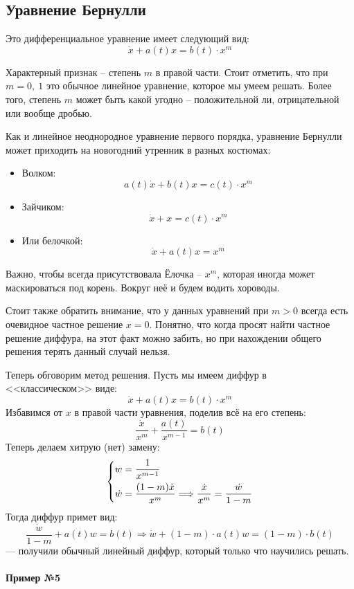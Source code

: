 \documentclass[a4paper,12pt]{article}
\newcommand{\dw}{\dot{w}}
\newcommand{\dx}{\dot{x}}
\begin{document}
\subsection{Уравнение Бернулли}

Это дифференциальное уравнение имеет следующий вид:
\[\dx + a(t)x = b(t)\cdot x^m\]

Характерный признак -- степень $m$ в правой части. Стоит отметить, что при $m = 0,\ 1$ это обычное линейное уравнение, которое мы умеем решать. Более того, степень $m$ может быть какой угодно -- положительной ли, отрицательной или вообще дробью.

Как и линейное неоднородное уравнение первого порядка, уравнение Бернулли может приходить на новогодний утренник в разных костюмах:
\begin{itemize}
	\item Волком:
		\[a(t)\dx +  b(t)x = c(t) \cdot x^m\]
	\item Зайчиком:
		\[\dx + x = c(t) \cdot x^m\]
	\item Или белочкой:
		\[\dx + a(t)x = x^m\]
\end{itemize}
Важно, чтобы всегда присутствовала Ёлочка -- $x^m$, которая иногда может маскироваться под корень. Вокруг неё и будем водить хороводы.

Стоит также обратить внимание, что у данных уравнений при $m > 0$ всегда есть очевидное частное решение $x = 0$. Понятно, что когда просят найти частное решение диффура, на этот факт можно забить, но при нахождении общего решения терять данный случай нельзя.

Теперь обговорим метод решения. Пусть мы имеем диффур в <<классическом>> виде:
\[\dx + a(t)x = b(t)\cdot x^m\]
Избавимся от $x$ в правой части уравнения, поделив всё на его степень:
\[\dfrac{\dx}{x^m} + \dfrac{a(t)}{x^{m - 1}} = b(t)\]
Теперь делаем хитрую (нет) замену:
\[\left\{\begin{gathered}
w = \dfrac{1}{x^{m - 1}}\hfill\\
\dw = \dfrac{(1 - m)\dx}{x^m} \Longrightarrow \dfrac{\dx}{x^m} = \dfrac{\dw}{1 - m}\hfill
\end{gathered}\right.\]
Тогда диффур примет вид:
\[\dfrac{\dw}{1 - m} + a(t)w = b(t) \Longrightarrow \dw + (1 - m)\cdot a(t)w = (1 - m)\cdot b(t)\] --- получили обычный линейный диффур, который только что научились решать.
\ \\

\textbf{Пример №5}
\end{document}
